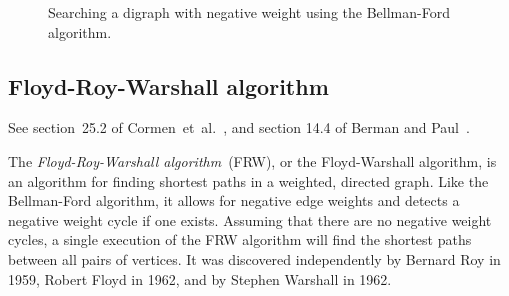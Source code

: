 \begin{figure}[!htbp]
\centering
{}
\caption{Searching a digraph with negative weight using the
  Bellman-Ford algorithm.}
\label{fig:graph_algorithms:Bellman_Ford_negative_weights}
\end{figure}



\subsection{Floyd-Roy-Warshall algorithm}

See section~25.2 of Cormen~et~al.~\cite{CormenEtAl2001}, and section
14.4 of Berman and Paul~\cite{BermanPaul1997}.

The \emph{Floyd-Roy-Warshall algorithm}~(FRW), or the Floyd-Warshall
algorithm, is an algorithm for finding shortest paths in a weighted,
directed graph. Like the Bellman-Ford algorithm, it allows for
negative edge weights and detects a negative weight cycle if one
exists. Assuming that there are no negative weight cycles, a single
execution of the FRW algorithm will find the shortest paths between
all pairs of vertices. It was discovered independently by Bernard Roy
in 1959, Robert Floyd in 1962, and by Stephen Warshall in 1962.

